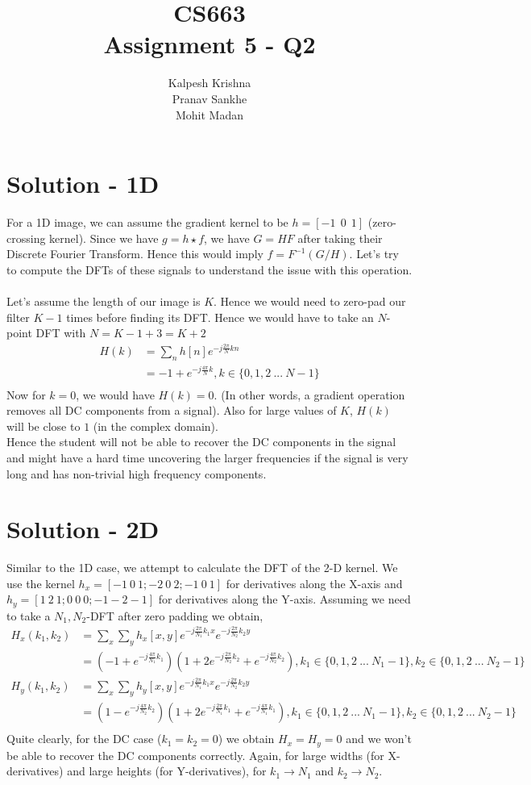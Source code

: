 \documentclass[11pt]{article}
\title{\textbf{CS663 \\ Assignment 5 - Q2}}
\author{Kalpesh Krishna\\ Pranav Sankhe \\ Mohit Madan}
\date{}
\begin{document}
\maketitle
\section{Solution - 1D}
For a 1D image, we can assume the gradient kernel to be $h = [-1~~0~~1]$ (zero-crossing kernel). Since we have $g = h \star f$, we have $G = HF$ after taking their Discrete Fourier Transform. Hence this would imply $f = F^{-1}(G / H)$. Let's try to compute the DFTs of these signals to understand the issue with this operation.\\\\
Let's assume the length of our image is $K$. Hence we would need to zero-pad our filter $K-1$ times before finding its DFT. Hence we would have to take an $N$-point DFT with $N=K-1+3=K+2$
\begin{align*}
H(k) &= \sum_{n} h[n]e^{-j\frac{2\pi}{N}kn}\\
&= -1 + e^{-j\frac{4\pi}{N}k}, k \in \{0, 1, 2~...~N-1\}\\
\end{align*}
Now for $k=0$, we would have $H(k)=0$. (In other words, a gradient operation removes all DC components from a signal). Also for large values of $K$, $H(k)$ will be close to $1$ (in the complex domain).\\
Hence the student will not be able to recover the DC components in the signal and might have a hard time uncovering the larger frequencies if the signal is very long and has non-trivial high frequency components.
\section{Solution - 2D}
Similar to the 1D case, we attempt to calculate the DFT of the 2-D kernel. We use the kernel $h_x = [-1~0~1;-2~0~2;-1~0~1]$ for derivatives along the X-axis and $h_y = [1~2~1;0~0~0;-1-2-1]$ for derivatives along the Y-axis. Assuming we need to take a $N_1,N_2$-DFT after zero padding we obtain,
\begin{align*}
H_x(k_1, k_2) &= \sum_{x} \sum_{y} h_x[x,y]e^{-j\frac{2\pi}{N_1}k_1x}e^{-j\frac{2\pi}{N_2}k_2y}\\
&= (-1 + e^{-j\frac{4\pi}{N_1}k_1})(1 + 2e^{-j\frac{2\pi}{N_2}k_2} + e^{-j\frac{4\pi}{N_2}k_2}), k_1 \in \{0, 1, 2~...~N_1-1\}, k_2 \in \{0, 1, 2~...~N_2-1\}\\
H_y(k_1, k_2) &= \sum_{x} \sum_{y} h_y[x,y]e^{-j\frac{2\pi}{N_1}k_1x}e^{-j\frac{2\pi}{N_2}k_2y}\\
&= (1 - e^{-j\frac{4\pi}{N_2}k_2})(1 + 2e^{-j\frac{2\pi}{N_1}k_1} + e^{-j\frac{4\pi}{N_1}k_1}), k_1 \in \{0, 1, 2~...~N_1-1\}, k_2 \in \{0, 1, 2~...~N_2-1\}\\
\end{align*}
Quite clearly, for the DC case ($k_1 = k_2 = 0$) we obtain $H_x = H_y = 0$ and we won't be able to recover the DC components correctly. Again, for large widths (for X-derivatives) and large heights (for Y-derivatives), for $k_1 \rightarrow N_1$ and $k_2 \rightarrow N_2$.
\end{document}
